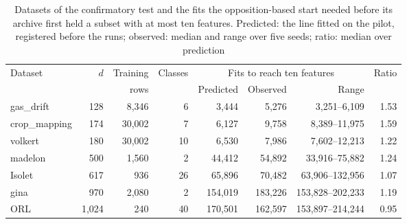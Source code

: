 \begin{table}[!tbp]
\caption{Datasets of the confirmatory test and the fits the opposition-based start needed before its archive first held a subset with at most ten features. Predicted: the line fitted on the pilot, registered before the runs; observed: median and range over five seeds; ratio: median over prediction}
\label{tab:confirm}
\centering
\small
\begin{tabular}{@{}lrrrrrrr@{}}
\toprule
Dataset & $d$ & Training & Classes & \multicolumn{3}{c}{Fits to reach ten features} & Ratio \\
\cmidrule(lr){5-7}
 & & rows & & Predicted & Observed & Range & \\
\midrule
gas\_drift & 128 & 8{,}346 & 6 & 3{,}444 & 5{,}276 & 3{,}251--6{,}109 & 1.53 \\
crop\_mapping & 174 & 30{,}002 & 7 & 6{,}127 & 9{,}758 & 8{,}389--11{,}975 & 1.59 \\
volkert & 180 & 30{,}002 & 10 & 6{,}530 & 7{,}986 & 7{,}602--12{,}213 & 1.22 \\
madelon & 500 & 1{,}560 & 2 & 44{,}412 & 54{,}892 & 33{,}916--75{,}882 & 1.24 \\
Isolet & 617 & 936 & 26 & 65{,}896 & 70{,}482 & 63{,}906--132{,}956 & 1.07 \\
gina & 970 & 2{,}080 & 2 & 154{,}019 & 183{,}226 & 153{,}828--202{,}233 & 1.19 \\
ORL & 1{,}024 & 240 & 40 & 170{,}501 & 162{,}597 & 153{,}897--214{,}244 & 0.95 \\
\bottomrule
\end{tabular}
\end{table}
